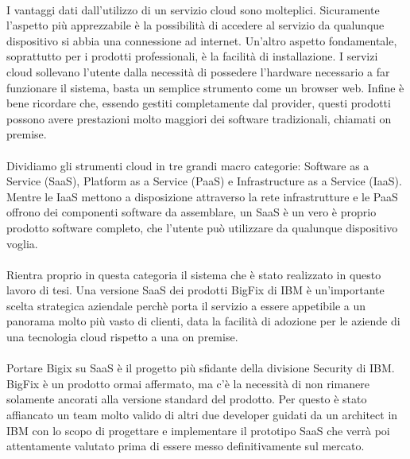 \paragraph{}
I vantaggi dati dall'utilizzo di un servizio cloud sono molteplici. Sicuramente l'aspetto più apprezzabile è la possibilità di accedere al servizio da qualunque dispositivo si abbia una connessione ad internet. Un'altro aspetto fondamentale, soprattutto per i prodotti professionali, è la facilità di installazione. I servizi cloud sollevano l'utente dalla necessità di possedere l'hardware necessario a far funzionare il sistema, basta un semplice strumento come un browser web. Infine è bene ricordare che, essendo gestiti completamente dal provider, questi prodotti possono avere prestazioni molto maggiori dei software tradizionali, chiamati on premise.
\paragraph{}
Dividiamo gli strumenti cloud in tre grandi macro categorie: Software as a Service (SaaS), Platform as a Service (PaaS) e Infrastructure as a Service (IaaS). Mentre le IaaS mettono a disposizione attraverso la rete infrastrutture e le PaaS offrono dei componenti software da assemblare, un SaaS è un vero è proprio prodotto software completo, che l'utente può utilizzare da qualunque dispositivo voglia.

\paragraph{}
Rientra proprio in questa categoria il sistema che è stato realizzato in questo lavoro di tesi. Una versione SaaS dei prodotti BigFix di IBM è un'importante scelta strategica aziendale perchè porta il servizio a essere appetibile a un panorama molto più vasto di clienti, data la facilità di adozione per le aziende di una tecnologia cloud rispetto a una on premise.
\paragraph{}
Portare Bigix su SaaS è il progetto più sfidante della divisione Security di IBM. BigFix è un prodotto ormai affermato, ma c'è la necessità di non rimanere solamente ancorati alla versione standard del prodotto. Per questo è stato affiancato un team molto valido di altri due developer guidati da un architect in IBM con lo scopo di progettare e implementare il prototipo SaaS che verrà poi attentamente valutato prima di essere messo definitivamente sul mercato.

